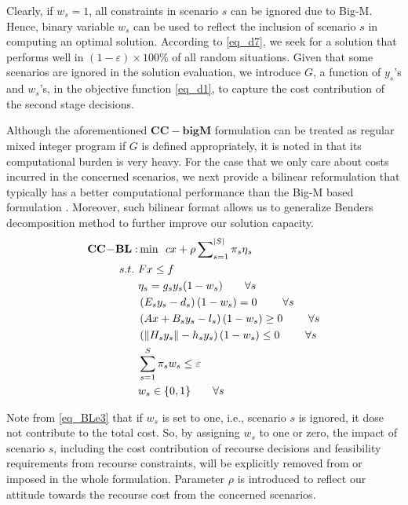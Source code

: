 \documentclass[journal]{IEEEtran}
\theoremstyle{remark}
\begin{document}
Clearly, if $w_s=1$, all constraints in scenario $s$ can be ignored
due to Big-M. Hence, binary variable $w_s$ can be used to reflect the inclusion of scenario $s$
in computing an optimal solution.
According to \eqref{eq_d7}, we
seek for a solution that performs well in $(1-\varepsilon)\times 100\%$ of all random situations. Given that some scenarios are ignored in the solution evaluation, we introduce $G$, a function of $y_s$'s and $w_s$'s,  in the objective function \eqref{eq_d1},  to capture the cost contribution of the second stage decisions.

Although the aforementioned $\mathbf{CC - bigM}$ formulation can be treated as
regular mixed integer program if $G$ is defined appropriately, it is noted in \citep{Zeng_An_Kuznia_2014}
that its computational burden is very heavy. For the case that we only care about costs incurred in the concerned
scenarios, we next provide a  bilinear reformulation that
typically has a better computational performance than the Big-M based formulation \citep{Zeng_An_Kuznia_2014}. Moreover, such bilinear format allows us to generalize Benders decomposition method to further improve our solution capacity.
\begin{subequations}
 \begin{align}
{\bf{CC\!-\!BL}}: & \min \,\,\,cx + \rho \sum\nolimits_{s = 1}^{|S|} \pi_s\eta{_s}            \label{eq_e1}\\
      s.t.\,\,      & Fx \le f                       \label{eq_e2}\\
     & \eta_s = g_sy_s( 1 - {w_s} )    \qquad  \forall s   \label{eq_BLe3}\\
     & \left( {{E_s}{y_s} - {d_s}} \right)\left( {1 - {w_s}} \right) = 0 \ \qquad   \forall s  \label{eq_e4}\\ %
     & \left( {Ax + {B_s}{y_s} - {l_s}} \right)\left( {1 - {w_s}} \right) \ge 0 \  \qquad   \forall s  \label{eq_e5}\\ %
     & \left( {\left\| {{H_s}{y_s}} \right\| - {h_s}{y_s}} \right)\left( {1 - {w_s}} \right) \le 0   \  \qquad \forall s   \label{eq_e6}\\ %
     & \sum\limits_{s = 1}^S {{\pi _s}{w_s} \le \varepsilon }                      \label{eq_e7}\\
     & {w_s} \in \{ 0,1\}  \qquad         \forall s \label{eq_e8}
\end{align}
\end{subequations}

 Note from \eqref{eq_BLe3} that if $w_s$ is set to one, i.e., scenario $s$ is ignored, it dose not contribute to the total cost. So, by assigning $w_s$ to one or zero, the impact of scenario $s$, including the cost contribution of recourse decisions and feasibility requirements from recourse constraints, will be explicitly removed from or imposed in the whole formulation. Parameter $\rho$ is introduced to reflect our attitude towards the recourse cost from the concerned scenarios.
\end{document}
